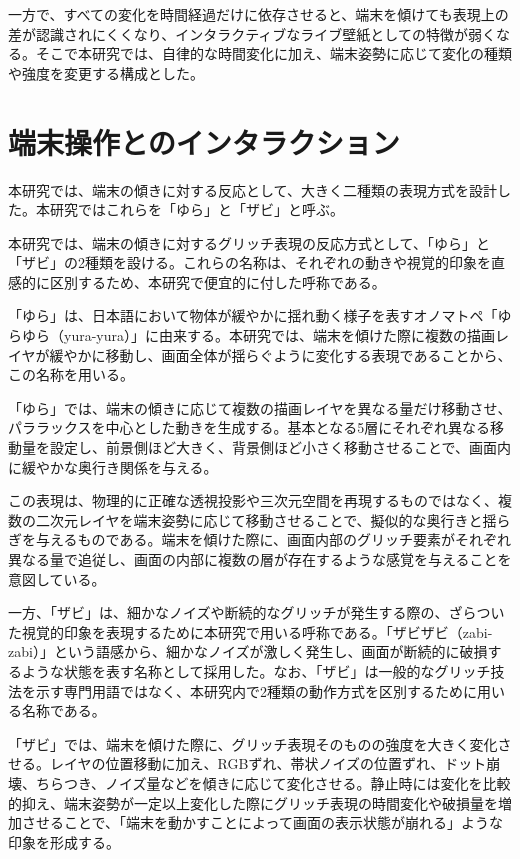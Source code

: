 一方で、すべての変化を時間経過だけに依存させると、端末を傾けても表現上の差が認識されにくくなり、インタラクティブなライブ壁紙としての特徴が弱くなる。そこで本研究では、自律的な時間変化に加え、端末姿勢に応じて変化の種類や強度を変更する構成とした。


\section{端末操作とのインタラクション}

本研究では、端末の傾きに対する反応として、大きく二種類の表現方式を設計した。本研究ではこれらを「ゆら」と「ザビ」と呼ぶ。

本研究では、端末の傾きに対するグリッチ表現の反応方式として、「ゆら」と「ザビ」の2種類を設ける。これらの名称は、それぞれの動きや視覚的印象を直感的に区別するため、本研究で便宜的に付した呼称である。

「ゆら」は、日本語において物体が緩やかに揺れ動く様子を表すオノマトペ「ゆらゆら（yura-yura）」に由来する。本研究では、端末を傾けた際に複数の描画レイヤが緩やかに移動し、画面全体が揺らぐように変化する表現であることから、この名称を用いる。

「ゆら」では、端末の傾きに応じて複数の描画レイヤを異なる量だけ移動させ、パララックスを中心とした動きを生成する。基本となる5層にそれぞれ異なる移動量を設定し、前景側ほど大きく、背景側ほど小さく移動させることで、画面内に緩やかな奥行き関係を与える。

この表現は、物理的に正確な透視投影や三次元空間を再現するものではなく、複数の二次元レイヤを端末姿勢に応じて移動させることで、擬似的な奥行きと揺らぎを与えるものである。端末を傾けた際に、画面内部のグリッチ要素がそれぞれ異なる量で追従し、画面の内部に複数の層が存在するような感覚を与えることを意図している。

一方、「ザビ」は、細かなノイズや断続的なグリッチが発生する際の、ざらついた視覚的印象を表現するために本研究で用いる呼称である。「ザビザビ（zabi-zabi）」という語感から、細かなノイズが激しく発生し、画面が断続的に破損するような状態を表す名称として採用した。なお、「ザビ」は一般的なグリッチ技法を示す専門用語ではなく、本研究内で2種類の動作方式を区別するために用いる名称である。

「ザビ」では、端末を傾けた際に、グリッチ表現そのものの強度を大きく変化させる。レイヤの位置移動に加え、RGBずれ、帯状ノイズの位置ずれ、ドット崩壊、ちらつき、ノイズ量などを傾きに応じて変化させる。静止時には変化を比較的抑え、端末姿勢が一定以上変化した際にグリッチ表現の時間変化や破損量を増加させることで、「端末を動かすことによって画面の表示状態が崩れる」ような印象を形成する。

